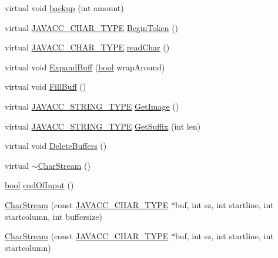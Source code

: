 \begin{DoxyCompactItemize}
\item 
virtual void \hyperlink{classvhdl_1_1parser_1_1_char_stream_aea30b248a3b05857e3e60101afd2617a}{backup} (int amount)
\item 
virtual \hyperlink{_java_c_c_8h_a401fffd20e03e2993f9588187b65afc3}{J\+A\+V\+A\+C\+C\+\_\+\+C\+H\+A\+R\+\_\+\+T\+Y\+P\+E} \hyperlink{classvhdl_1_1parser_1_1_char_stream_abfef003263c49f685bfd49610dc12a08}{Begin\+Token} ()
\item 
virtual \hyperlink{_java_c_c_8h_a401fffd20e03e2993f9588187b65afc3}{J\+A\+V\+A\+C\+C\+\_\+\+C\+H\+A\+R\+\_\+\+T\+Y\+P\+E} \hyperlink{classvhdl_1_1parser_1_1_char_stream_a555f81eb2fcb4bafbe692bc3a357d120}{read\+Char} ()
\item 
virtual void \hyperlink{classvhdl_1_1parser_1_1_char_stream_a5192ebe3a55d14f239233283ef78559d}{Expand\+Buff} (\hyperlink{qglobal_8h_a1062901a7428fdd9c7f180f5e01ea056}{bool} wrap\+Around)
\item 
virtual void \hyperlink{classvhdl_1_1parser_1_1_char_stream_a4d019c2c4c72dc14b442de6ce40e9607}{Fill\+Buff} ()
\item 
virtual \hyperlink{_java_c_c_8h_a7941da0682a76ffa9869d8458e166062}{J\+A\+V\+A\+C\+C\+\_\+\+S\+T\+R\+I\+N\+G\+\_\+\+T\+Y\+P\+E} \hyperlink{classvhdl_1_1parser_1_1_char_stream_a83b0313890fbf2fa4f8443039472db87}{Get\+Image} ()
\item 
virtual \hyperlink{_java_c_c_8h_a7941da0682a76ffa9869d8458e166062}{J\+A\+V\+A\+C\+C\+\_\+\+S\+T\+R\+I\+N\+G\+\_\+\+T\+Y\+P\+E} \hyperlink{classvhdl_1_1parser_1_1_char_stream_a6a3f7e4e14d712f26aa3728c8e0e4dbf}{Get\+Suffix} (int len)
\item 
virtual void \hyperlink{classvhdl_1_1parser_1_1_char_stream_ade1113e8f90c93ce43cb949205f4746f}{Delete\+Buffers} ()
\item 
virtual \hyperlink{classvhdl_1_1parser_1_1_char_stream_ab4fb67513988560781f46bb5124f7966}{$\sim$\+Char\+Stream} ()
\item 
\hyperlink{qglobal_8h_a1062901a7428fdd9c7f180f5e01ea056}{bool} \hyperlink{classvhdl_1_1parser_1_1_char_stream_a6a84b589f280fbac29dbb2325196bb05}{end\+Of\+Input} ()
\item 
\hyperlink{classvhdl_1_1parser_1_1_char_stream_acf7477162d40d6685ec22bbb9fe27cb5}{Char\+Stream} (const \hyperlink{_java_c_c_8h_a401fffd20e03e2993f9588187b65afc3}{J\+A\+V\+A\+C\+C\+\_\+\+C\+H\+A\+R\+\_\+\+T\+Y\+P\+E} $\ast$buf, int sz, int startline, int startcolumn, int buffersize)
\item 
\hyperlink{classvhdl_1_1parser_1_1_char_stream_a6c5b21048c7fc72980a39baf5cdda865}{Char\+Stream} (const \hyperlink{_java_c_c_8h_a401fffd20e03e2993f9588187b65afc3}{J\+A\+V\+A\+C\+C\+\_\+\+C\+H\+A\+R\+\_\+\+T\+Y\+P\+E} $\ast$buf, int sz, int startline, int startcolumn)

\end{DoxyCompactItemize}
